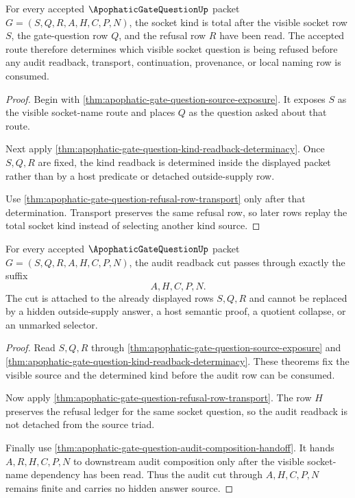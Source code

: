 \begin{theorem}
\label{thm:apophatic-gate-question-kind-socket-totality}
For every accepted $\ApophaticGateQuestionUp$ packet $G=(S,Q,R,A,H,C,P,N)$, the socket kind is total after the visible socket row $S$, the gate-question row $Q$, and the refusal row $R$ have been read. The accepted route therefore determines which visible socket question is being refused before any audit readback, transport, continuation, provenance, or local naming row is consumed.
\end{theorem}
\begin{proof}
Begin with \autoref{thm:apophatic-gate-question-source-exposure}. It exposes $S$ as the visible socket-name route and places $Q$ as the question asked about that route.

Next apply \autoref{thm:apophatic-gate-question-kind-readback-determinacy}. Once $S,Q,R$ are fixed, the kind readback is determined inside the displayed packet rather than by a host predicate or detached outside-supply row.

Use \autoref{thm:apophatic-gate-question-refusal-row-transport} only after that determination. Transport preserves the same refusal row, so later rows replay the total socket kind instead of selecting another kind source.
\end{proof}

\begin{theorem}
\label{thm:apophatic-gate-question-audit-readback-cut}
For every accepted $\ApophaticGateQuestionUp$ packet $G=(S,Q,R,A,H,C,P,N)$, the audit readback cut passes through exactly the suffix
$$
A,H,C,P,N.
$$
The cut is attached to the already displayed rows $S,Q,R$ and cannot be replaced by a hidden outside-supply answer, a host semantic proof, a quotient collapse, or an unmarked selector.
\end{theorem}
\begin{proof}
Read $S,Q,R$ through \autoref{thm:apophatic-gate-question-source-exposure} and \autoref{thm:apophatic-gate-question-kind-readback-determinacy}. These theorems fix the visible source and the determined kind before the audit row can be consumed.

Now apply \autoref{thm:apophatic-gate-question-refusal-row-transport}. The row $H$ preserves the refusal ledger for the same socket question, so the audit readback is not detached from the source triad.

Finally use \autoref{thm:apophatic-gate-question-audit-composition-handoff}. It hands $A,R,H,C,P,N$ to downstream audit composition only after the visible socket-name dependency has been read. Thus the audit cut through $A,H,C,P,N$ remains finite and carries no hidden answer source.
\end{proof}


